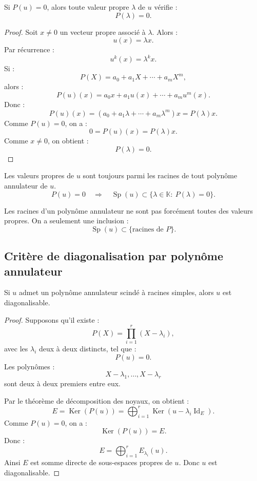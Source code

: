\documentclass[11pt,a4paper]{article}
\newcommand{\K}{\mathbb K}
\newcommand{\Ker}{\operatorname{Ker}}
\newcommand{\Id}{\operatorname{Id}}
\newcommand{\Sp}{\operatorname{Sp}}
\begin{document}
\begin{theorembox}
Si \(P(u)=0\), alors toute valeur propre \(\lambda\) de \(u\) vérifie :
\[
P(\lambda)=0.
\]
\end{theorembox}

\begin{proof}
Soit \(x\neq0\) un vecteur propre associé à \(\lambda\).  
Alors :
\[
u(x)=\lambda x.
\]
Par récurrence :
\[
u^k(x)=\lambda^kx.
\]
Si :
\[
P(X)=a_0+a_1X+\cdots+a_mX^m,
\]
alors :
\[
P(u)(x)
=
a_0x+a_1u(x)+\cdots+a_mu^m(x).
\]
Donc :
\[
P(u)(x)
=
(a_0+a_1\lambda+\cdots+a_m\lambda^m)x
=
P(\lambda)x.
\]
Comme \(P(u)=0\), on a :
\[
0=P(u)(x)=P(\lambda)x.
\]
Comme \(x\neq0\), on obtient :
\[
P(\lambda)=0.
\]
\end{proof}

\begin{retenirbox}
Les valeurs propres de \(u\) sont toujours parmi les racines de tout polynôme annulateur de \(u\).
\[
P(u)=0
\quad\Longrightarrow\quad
\Sp(u)\subset\{\lambda\in\K:\ P(\lambda)=0\}.
\]
\end{retenirbox}

\begin{erreurbox}
Les racines d'un polynôme annulateur ne sont pas forcément toutes des valeurs propres.  
On a seulement une inclusion :
\[
\Sp(u)\subset\{\text{racines de }P\}.
\]
\end{erreurbox}

\subsection{Critère de diagonalisation par polynôme annulateur}

\begin{theorembox}
Si \(u\) admet un polynôme annulateur scindé à racines simples, alors \(u\) est diagonalisable.
\end{theorembox}

\begin{proof}
Supposons qu'il existe :
\[
P(X)=\prod_{i=1}^r(X-\lambda_i),
\]
avec les \(\lambda_i\) deux à deux distincts, tel que :
\[
P(u)=0.
\]
Les polynômes :
\[
X-\lambda_1,\dots,X-\lambda_r
\]
sont deux à deux premiers entre eux.

Par le théorème de décomposition des noyaux, on obtient :
\[
E=\Ker(P(u))
=
\bigoplus_{i=1}^r \Ker(u-\lambda_i\Id_E).
\]
Comme \(P(u)=0\), on a :
\[
\Ker(P(u))=E.
\]
Donc :
\[
E=\bigoplus_{i=1}^r E_{\lambda_i}(u).
\]
Ainsi \(E\) est somme directe de sous-espaces propres de \(u\).  
Donc \(u\) est diagonalisable.
\end{proof}
\end{document}
